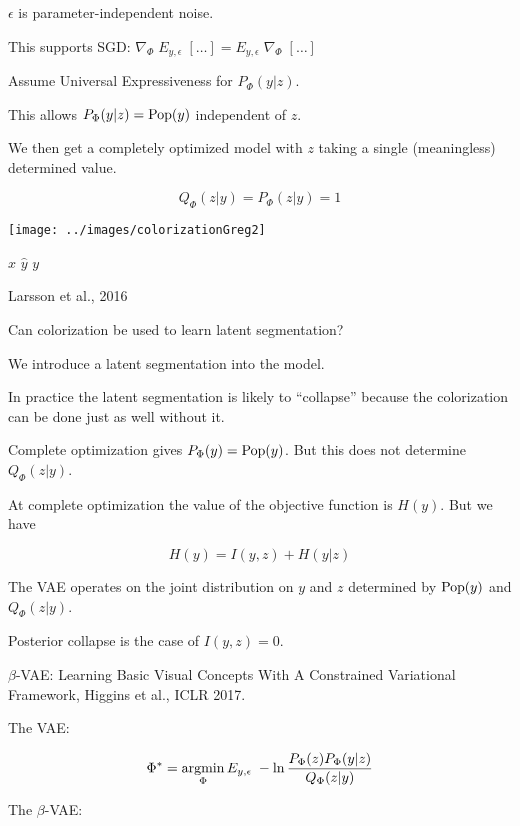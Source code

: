 {\vfill
$\epsilon$ is parameter-independent noise.

\vfill
This supports SGD: $\nabla_\Phi \;E_{y,\epsilon}\; [\ldots] = E_{y,\epsilon}\; \nabla_\Phi\;[\ldots]$


Assume Universal Expressiveness for $P_\Phi(y|z)$.

\vfill
This allows $P_\Phi(y|z) = \mathrm{Pop}(y)$ independent of $z$.

\vfill
We then get a completely optimized model with $z$ taking a single (meaningless) determined value.

\vfill
$$Q_\Phi(z|y) = P_\Phi(z|y) = 1$$

\medskip
\centerline{\texttt{[image: ../images/colorizationGreg2]}}
\centerline{$x$ \hspace{4em} $\hat{y}$ \hspace{4em} $y$}
\centerline{\huge Larsson et al., 2016}

\vfill
Can colorization be used to learn latent segmentation?

\vfill
We introduce a latent segmentation into the model.

\vfill
In practice the latent segmentation is likely to ``collapse'' because the colorization can be done just as well without it.



\vfill
Complete optimization gives $P_\Phi(y) = \mathrm{Pop}(y)$.  But this does not determine $Q_\Phi(z|y)$.

\vfill
At complete optimization the value of the objective function is $H(y)$.  But we have

\vfill
$$H(y) = I(y,z) +       H(y|z)$$

\vfill
The VAE operates on the joint distribution on $y$ and $z$ determined by $\mathrm{Pop}(y)$ and $Q_\Phi(z|y)$.

\vfill
Posterior collapse is the case of $I(y,z) = 0$.


$\beta$-VAE: Learning Basic Visual Concepts With A
Constrained Variational Framework, Higgins et al., ICLR 2017.

\vfill
The VAE:

$$\Phi^* = \operatorname*{argmin}_\Phi E_{y,\epsilon}\;-\ln \frac{P_\Phi(z)P_\Phi(y|z)}{Q_\Phi(z|y)}$$

\vfill
The $\beta$-VAE:

}
